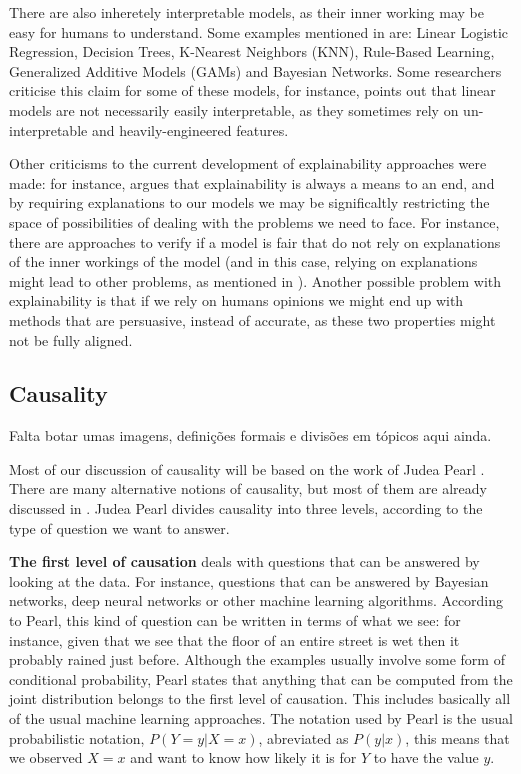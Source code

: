 There are also inheretely interpretable models, as their inner working may be easy for humans to understand. Some examples mentioned in \cite{belle2021principles} are: Linear Logistic Regression, Decision Trees, K-Nearest Neighbors (KNN), Rule-Based Learning, Generalized Additive Models (GAMs) and Bayesian Networks. Some researchers criticise this claim for some of these models, for instance, \cite{lipton2018mythos} points out that linear models are not necessarily easily interpretable, as they sometimes rely on un-interpretable and heavily-engineered features.

Other criticisms to the current development of explainability approaches were made: for instance, \cite{krishnan2020against} argues that explainability is always a means to an end, and by requiring explanations to our models we may be significaltly restricting the space of possibilities of dealing with the problems we need to face. For instance, there are approaches to verify if a model is fair that do not rely on explanations of the inner workings of the model (and in this case, relying on explanations might lead to other problems, as mentioned in \cite{ExplainAll}). Another possible problem with explainability is that if we rely on humans opinions we might end up with methods that are persuasive, instead of accurate, as these two properties might not be fully aligned. 

\subsection{Causality}

{\color{red} Falta botar umas imagens, definições formais e divisões em tópicos aqui ainda.}

Most of our discussion of causality will be based on the work of Judea Pearl \cite{Causality}. There are many alternative notions of causality, but most of them are already discussed in \cite{Causality}. Judea Pearl divides causality into three levels, according to the type of question we want to answer. 

\textbf{The first level of causation} deals with questions that can be answered by looking at the data. For instance, questions that can be answered by Bayesian networks, deep neural networks or other machine learning algorithms. According to Pearl, this kind of question can be written in terms of what we see: for instance, given that we see that the floor of an entire street is wet then it probably rained just before. Although the examples usually involve some form of conditional probability, Pearl states that anything that can be computed from the joint distribution belongs to the first level of causation. This includes basically all of the usual machine learning approaches. The notation used by Pearl is the usual probabilistic notation, $P(Y=y|X=x)$, abreviated as $P(y|x)$, this means that we observed $X=x$ and want to know how likely it is for $Y$ to have the value $y$.

